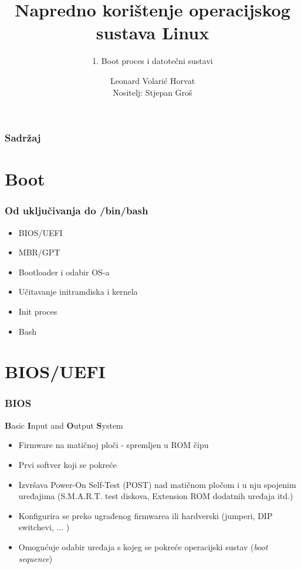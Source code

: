 \documentclass[t]{beamer}
\date{\todayiso}
\title[NKOSL]{Napredno korištenje operacijskog sustava Linux}
\author[Leonard Volarić Horvat]{Leonard Volarić Horvat\\{\small Nositelj: Stjepan Groš}}
\subtitle{1. Boot proces i datotečni sustavi}
\institute[FER]{Sveučilište u Zagrebu\\Fakultet elektrotehnike i računarstva}
\begin{document}
{
	\begin{frame}
		\maketitle
	\end{frame}
}

\begin{frame}
	\frametitle{Sadržaj}
	\tableofcontents
\end{frame}

\section{Boot}
\begin{frame}
    \frametitle{Od uključivanja do /bin/bash}
    \begin{itemize}
        \item BIOS/UEFI
        \item MBR/GPT
        \item Bootloader i odabir OS-a
        \item Učitavanje initramdiska i kernela
        \item Init proces 
        \item Bash
    \end{itemize}
\end{frame}




\section{BIOS/UEFI}
\begin{frame}
	\frametitle{BIOS}
	\textbf{B}asic \textbf{I}nput and \textbf{O}utput \textbf{S}ystem
	\begin{itemize}
		\item Firmware na matičnoj ploči - spremljen u ROM čipu
		\item Prvi softver koji se pokreće
		\item Izvršava Power-On Self-Test (POST) nad matičnom pločom i u nju  spojenim uređajima (S.M.A.R.T. test diskova, Extension ROM dodatnih uređaja itd.)
		\item Konfigurira se preko ugrađenog firmwarea ili hardverski (jumperi, DIP switchevi, ... )
		\item Omogućuje odabir uređaja s kojeg se pokreće operacijski sustav (\textit{boot sequence})
	\end{itemize}
\end{frame}
\end{document}
